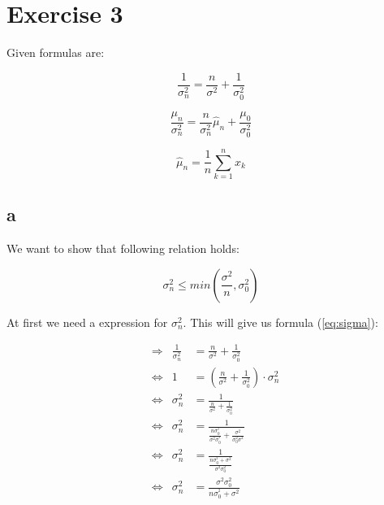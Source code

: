\section{Exercise 3}
Given formulas are:\\
\begin{center}
    \begin{equation}
        \frac{1}{\sigma^{2}_{n}}=\frac{n}{\sigma^{2}}+\frac{1}{\sigma^{2}_{0}}
        \label{eq:sigma}
    \end{equation}
\end{center}
\begin{center}
    \begin{equation}
        \frac{\mu_{n}}{\sigma^{2}_{n}}=\frac{n}{\sigma^{2}_{n}}\hat{\mu}_{n}+\frac{\mu_{0}}{\sigma^{2}_{0}}
    \end{equation}
\end{center}
\begin{center}
    \begin{equation}
        \hat{\mu}_{n}=\frac{1}{n}\sum_{k=1}^{n}x_{k}
    \end{equation}
\end{center}


\subsection{a}
We want to show that following relation holds:

\begin{center}
    \begin{equation}
        \sigma^{2}_{n}\le min\left(\frac{\sigma^{2}}{n},\sigma^{2}_{0}\right)
    \label{eq:3a}
    \end{equation}
\end{center}

At first we need a expression for $\sigma^{2}_{n}$. This will give us formula (\ref{eq:sigma}):

\begin{align*}
    &\Rightarrow&\frac{1}{\sigma^{2}_{n}} &=\frac{n}{\sigma^{2}}+\frac{1}{\sigma^{2}_{0}}\\
    &\Leftrightarrow& 1 &=\left(\frac{n}{\sigma^{2}}+\frac{1}{\sigma^{2}_{0}}\right)\cdot\sigma^{2}_{n}\\
    &\Leftrightarrow& \sigma^{2}_{n} &=\frac{1}{\frac{n}{\sigma^{2}}+\frac{1}{\sigma^{2}_{0}}}\\
    &\Leftrightarrow& \sigma^{2}_{n} &=\frac{1}{\frac{n\sigma^{^2}_{0}}{\sigma^{2}\sigma^{^2}_{0}}+\frac{\sigma^{2}}{\sigma^{2}_{0}\sigma^{2}}}\\
    &\Leftrightarrow& \sigma^{2}_{n} &=\frac{1}{\frac{n\sigma^{^2}_{0}+\sigma^{2}}{\sigma^2\sigma^{2}_{0}}}\\
    &\Leftrightarrow& \sigma^{2}_{n} &=\frac{\sigma^2\sigma^{2}_{0}}{n\sigma^{^2}_{0}+\sigma^{2}}
\end{align*}

